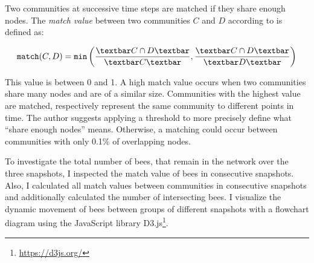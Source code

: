 Two communities at successive time steps are matched if they share enough nodes.
The \emph{match value} between two communities $C$ and $D$ according to \textcite{hopcroft2004tracking} is defined as:

\begin{equation}
\label{eq:match}
\texttt{match}(C,D) = \texttt{min}\left( \frac{\textbar C\cap D \textbar}{\textbar C\textbar }, \frac{\textbar C\cap D \textbar}{\textbar D \textbar }\right)
\end{equation}

This value is between 0 and 1. A high match value occurs when two communities share many nodes and are of a similar size. Communities with the highest value are matched, respectively represent the same community to different points in time. The author suggests applying a threshold to more precisely define what ``share enough nodes'' means. Otherwise, a matching could occur between communities with only 0.1\% of overlapping nodes.

To investigate the total number of bees, that remain in the network over the three snapshots, I inspected the match value of bees in consecutive snapshots. Also, I calculated all match values between communities in consecutive snapshots and additionally calculated the number of intersecting bees. I visualize the dynamic movement
of bees between groups of different snapshots with a flowchart diagram using the JavaScript library D3.js\footnote{\url{https://d3js.org/}}.